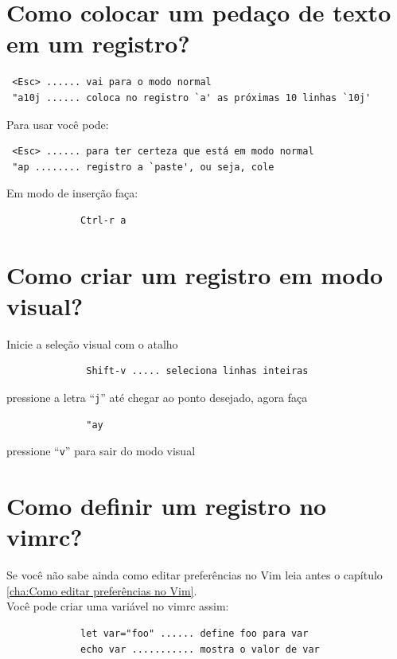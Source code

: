 \documentclass[10pt,a4paper,openany]{book}
\begin{document}
\section{Como colocar um pedaço de texto em um registro?}
\label{Como colocar um pedaço de texto em um registro?}

\begin{verbatim}
 <Esc> ...... vai para o modo normal
 "a10j ...... coloca no registro `a' as próximas 10 linhas `10j'
\end{verbatim}

Para usar você pode:

\begin{verbatim}
 <Esc> ...... para ter certeza que está em modo normal
 "ap ........ registro a `paste', ou seja, cole
\end{verbatim}

Em modo de inserção faça:

\begin{verbatim}
			 Ctrl-r a
\end{verbatim}

\section{Como criar um registro em modo visual?}
\label{Como criar um registro em modo visual?}
Inicie a seleção visual com o atalho

\begin{verbatim}
			  Shift-v ..... seleciona linhas inteiras
\end{verbatim}

pressione a letra ``\verb|j|'' até chegar ao ponto desejado, agora faça

\begin{verbatim}
			  "ay
\end{verbatim}

pressione ``\verb|v|'' para sair do modo visual

\section{Como definir um registro no vimrc?}
\label{Como definir um registro no vimrc?}

Se você não sabe ainda como editar preferências no Vim
leia antes o capítulo \ref{cha:Como editar preferências no Vim}. \\


Você pode criar uma variável no vimrc assim:

\begin{verbatim}
			 let var="foo" ...... define foo para var
			 echo var ........... mostra o valor de var
\end{verbatim}
\end{document}
